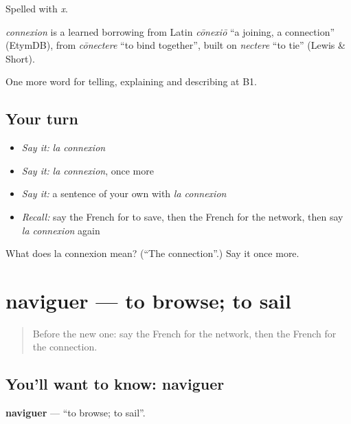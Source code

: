 Spelled with \emph{x}.

\begin{cousinweb}
\emph{connexion} is a learned borrowing from Latin \emph{cōnexiō} \textquotedblleft{}a joining, a connection\textquotedblright{} (EtymDB), from \emph{cōnectere} \textquotedblleft{}to bind together\textquotedblright{}, built on \emph{nectere} \textquotedblleft{}to tie\textquotedblright{} (Lewis \& Short).
\end{cousinweb}

\begin{grammarlens}[title={What you've built}]
One more word for telling, explaining and describing at B1.
\end{grammarlens}

\subsection*{Your turn}
\begin{itemize}
\raggedright
  \item \emph{Say it:} \emph{la connexion}
  \item \emph{Say it:} \emph{la connexion}, once more
  \item \emph{Say it:} a sentence of your own with \emph{la connexion}
  \item \emph{Recall:} say the French for to save, then the French for the network, then say \emph{la connexion} again
\end{itemize}

\begin{tcolorbox}[breakable,colback=teal!4,colframe=teal!35!black,title={Before you move on}]
What does la connexion mean? (\textquotedblleft{}The connection\textquotedblright{}.) Say it once more.
\end{tcolorbox}
\section[naviguer]{naviguer — to browse; to sail}

\label{lesson:FR-C398-naviguer}



\begin{quote}
Before the new one: say the French for the network, then the French for the connection.
\end{quote}

\subsection*{You'll want to know: naviguer}
\textbf{naviguer} — \textquotedblleft{}to browse; to sail\textquotedblright{}.

